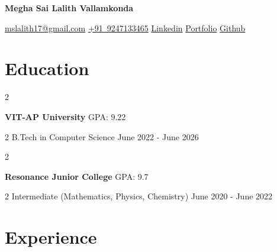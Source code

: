 \documentclass[11pt, letterpaper]{article}
\newenvironment{twocolentry}[2][]{
    \onecolentry
    \def\secondColumn{#2}
    \setcolumnwidth{\fill, 4.5 cm}
    \begin{paracol}{2}
}{
    \switchcolumn \raggedleft \secondColumn
    \end{paracol}
    \endonecolentry
} %
\newenvironment{header}{
    \setlength{\topsep}{0pt}\par\kern\topsep\centering\linespread{1.5}
}{
    \par\kern\topsep
} %
\begin{document}
    \newcommand{\AND}{\unskip
        \cleaders\copy\ANDbox\hskip\wd\ANDbox
        \ignorespaces
    }
    \newsavebox\ANDbox
    \sbox\ANDbox{$|$}

    \begin{header}
    \fontsize{25pt}{25pt}\selectfont \textbf{Megha Sai Lalith Vallamkonda} 
    \vspace{5pt}
    \large
    
    \mbox{\href{mailto:mslalith17@gmail.com}{mslalith17@gmail.com}}%
    \hspace{10pt}%
    \mbox{\href{tel:+91-9247133465}{+91 9247133465}}%
    \hspace{10pt}%
\mbox{\href{https://linkedin.com/in/lalithvallamkonda}{Linkedin}}%
    \hspace{10pt}%
    \mbox{\href{https://lalith-s-portfolio.vercel.app/}{Portfolio}}%
    \hspace{10pt}%
    \mbox{\href{https://github.com/Lalith17}{Github}}%
\end{header}


    \vspace{0.1 cm}
    
    \section{Education}
        \begin{twocolentry}{
            GPA: 9.22
        }
            {\textbf{VIT-AP University}}\end{twocolentry}

        \vspace{0.10 cm}
        \begin{twocolentry}{June 2022 - June 2026
} {B.Tech in Computer Science}\end{twocolentry}
        \vspace{0.2 cm}
\begin{twocolentry}{
            GPA: 9.7
        }
            {\textbf{Resonance Junior College}}\end{twocolentry}

        \vspace{0.10 cm}
        \begin{twocolentry}{June 2020 - June 2022
} {Intermediate (Mathematics, Physics, Chemistry)}\end{twocolentry}


    
    \section{Experience}
\end{document}
